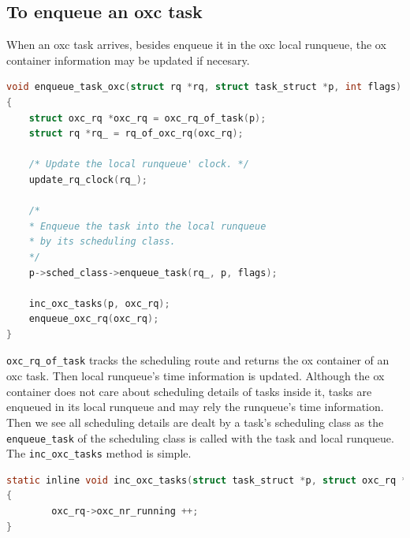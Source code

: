 \subsection{To enqueue an oxc task}
When an oxc task arrives, besides enqueue it in the oxc local runqueue,
the ox container information may be updated if necesary.
\begin{lstlisting}[language=C]
void enqueue_task_oxc(struct rq *rq, struct task_struct *p, int flags)
{
	struct oxc_rq *oxc_rq = oxc_rq_of_task(p);
	struct rq *rq_ = rq_of_oxc_rq(oxc_rq);

	/* Update the local runqueue' clock. */
	update_rq_clock(rq_);

	/*
	* Enqueue the task into the local runqueue
	* by its scheduling class.
	*/
	p->sched_class->enqueue_task(rq_, p, flags);

	inc_oxc_tasks(p, oxc_rq);
	enqueue_oxc_rq(oxc_rq);
}
\end{lstlisting}
\texttt{oxc\_rq\_of\_task} tracks the scheduling route and returns the ox
container of an oxc task. Then local runqueue's time information is updated.
Although the ox container does not care about scheduling details of tasks 
inside it, tasks are enqueued in its local runqueue and may rely the
runqueue's time information. Then we see all scheduling details are dealt 
by a task's scheduling class as the \texttt{enqueue\_task} of the
scheduling class is called with the task and local runqueue.
The \texttt{inc\_oxc\_tasks} method is simple.
\begin{lstlisting}[language=C]
static inline void inc_oxc_tasks(struct task_struct *p, struct oxc_rq *oxc_rq)
{
        oxc_rq->oxc_nr_running ++;
}
\end{lstlisting}

